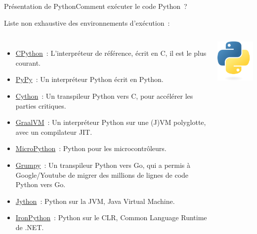 \documentclass{beamer}
\begin{document}
    \begin{frame}{Présentation de Python}{Comment exécuter le code Python~?}
        \begin{footnotesize}
            Liste non exhaustive des environnements d'exécution~:
            \begin{columns}
                \begin{itemize}
                    \item \href{https://github.com/python/cpython}{CPython}~: L'interpréteur de référence, écrit en C, il est le plus courant.
                    \item \href{https://pypy.org/}{PyPy}~: Un interpréteur Python écrit en Python.
                    \item \href{https://cython.org/}{Cython}~: Un transpileur Python vers C, pour accélérer les parties critiques.
                    \item \href{https://www.graalvm.org/python/}{GraalVM}~: Un interpréteur Python sur une (J)VM polyglotte, avec un compilateur JIT.
                    \item \href{https://micropython.org/}{MicroPython}~: Python pour les microcontrôleurs.
                    \item \href{https://github.com/google/grumpy}{Grumpy}~: Un transpileur Python vers Go, qui a permis à Google/Youtube de migrer des millions de lignes de code Python vers Go.
                    \item \href{https://www.jython.org/}{Jython}~: Python sur la JVM, Java Virtual Machine.
                    \item \href{https://ironpython.net/}{IronPython}~: Python sur le CLR, Common Language Runtime de .NET.
                \end{itemize}
                \centering
                \includegraphics[width=4cm]{image/python-logo}
            \end{columns}
        \end{footnotesize}
    \end{frame}
\end{document}

